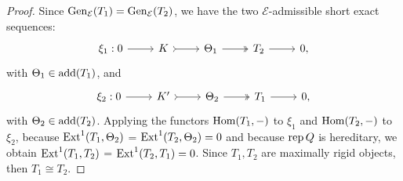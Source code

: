 \begin{proof}
Since $\operatorname{Gen}_\mathcal{E}(T_1) = \operatorname{Gen}_\mathcal{E}(T_2)$, we have the two $\mathcal{E}$-admissible short exact sequences:
\[\begin{tikzcd}
	\xi_1 : 0 & K & \Theta_1  & T_2 &  0,
	\arrow[from=1-1, to=1-2]
	\arrow[tail, from=1-2, to=1-3]
	\arrow[two heads,from=1-3, to=1-4]
	\arrow[from=1-4, to=1-5]
    \end{tikzcd} \]
with $\Theta_1 \in \operatorname{add}(T_1)$, and
\[\begin{tikzcd}
	\xi_2 : 0 & K' & \Theta_2  & T_1 &  0,
	\arrow[from=1-1, to=1-2]
	\arrow[tail, from=1-2, to=1-3]
	\arrow[two heads,from=1-3, to=1-4]
	\arrow[from=1-4, to=1-5]
    \end{tikzcd} \]
with $\Theta_2 \in \operatorname{add}(T_2)$. Applying the functors $\operatorname{Hom}(T_1,-)$ to $\xi_1$ and $\operatorname{Hom}(T_2,-)$ to $\xi_2$, because $\operatorname{Ext}^1(T_1,\Theta_2)$ = $\operatorname{Ext}^1(T_2,\Theta_2) = 0$ and because $\operatorname{rep} Q $ is hereditary, we obtain $\operatorname{Ext}^1(T_1,T_2)$ = $\operatorname{Ext}^1(T_2,T_1)=0$. Since $T_1,T_2$ are maximally rigid objects, then $T_1 \cong T_2$.
\end{proof}

